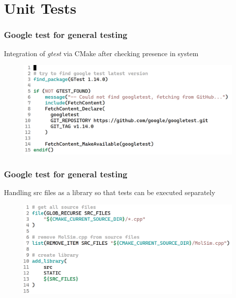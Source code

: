 \section{Unit Tests}

\begin{frame}
    \frametitle{Google test for general testing}

        Integration of \emph{gtest} via CMake after checking presence in system

    \begin{figure}[H]
        \includegraphics[width=\textwidth]{res/gtest3.png}
    \end{figure}


\end{frame}

\begin{frame}
    \frametitle{Google test for general testing}

        Handling src files as a library so that tests can be executed separately

    \begin{figure}[H]
        \includegraphics[width=\textwidth]{res/gtest1.png}
    \end{figure}


\end{frame}

